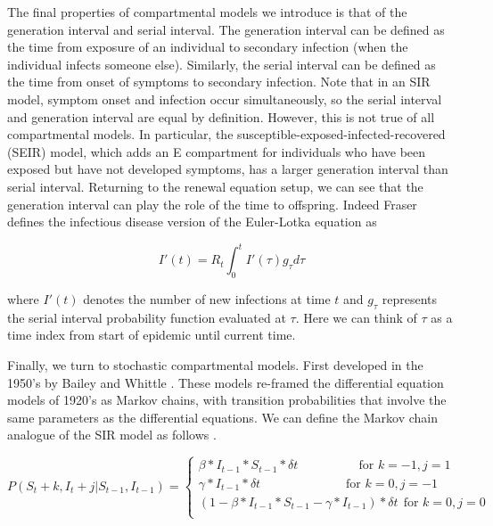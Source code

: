 \documentclass{umassthesis}          %
\begin{document}
The final properties of compartmental models we introduce is that of the generation interval and serial interval. The generation interval can be defined as the time from exposure of an individual to secondary infection (when the individual infects someone else). Similarly, the serial interval can be defined as the time from onset of symptoms to secondary infection. Note that in an SIR model, symptom onset and infection occur simultaneously, so the serial interval and generation interval are equal by definition. However, this is not true of all compartmental models. In particular, the susceptible-exposed-infected-recovered (SEIR) model, which adds an E compartment for individuals who have been exposed but have not developed symptoms, has a larger generation interval than serial interval. Returning to the renewal equation setup, we can see that the generation interval can play the role of the time to offspring. Indeed Fraser defines the infectious disease version of the Euler-Lotka equation as \cite{fraser2007estimating}

\begin{equation}
I'(t) = R_t \int_0^t I'(\tau) g_{\tau} d\tau
\end{equation}

where $I'(t)$ denotes the number of new infections at time $t$ and $g_{\tau}$ represents the serial interval probability function evaluated at $\tau$. Here we can think of $\tau$ as a time index from start of epidemic until current time.

Finally, we turn to stochastic compartmental models. First developed in the 1950's by Bailey and Whittle \cite{whittle1955outcome}\cite{bailey1953total}. These models re-framed the differential equation models of 1920's as Markov chains, with transition probabilities that involve the same parameters as the differential equations. We can define the Markov chain analogue of the SIR model as follows \cite{allen2010introduction}\cite{allen2000comparison}\cite{brauer2012mathematical}. 


\begin{equation}
    P(S_{t} +k, I_{t} + j | S_{t-1},I_{t-1}) =
    \begin{cases}
    \beta *I_{t-1} * S_{t-1} * \delta t \ \  \ \ \ \ \ \ \ \ \ \ \ \ \  \ \  \ \ \ \ \ \text{for } k=-1,j=1\\ 
      \gamma  *I_{t-1}*\delta t \ \ \ \ \ \ \ \ \ \ \ \ \ \ \ \ \ \ \ \ \ \ \ \ \ \ \  \ \  \ \ \text{for } k=0,j=-1\\
      
       (1 -\beta *I_{t-1} * S_{t-1}  -\gamma *I_{t-1})*\delta t   \ \ \text{for } k=0,j=0\\
    \end{cases}
\end{equation}
\end{document}
